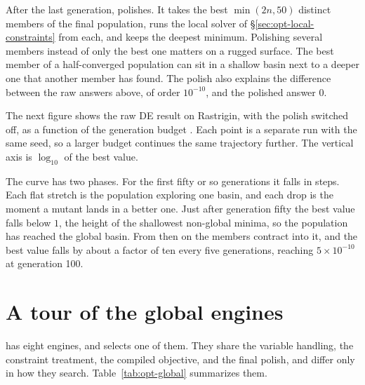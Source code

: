 After the last generation,  polishes. It takes the best
\(\min(2n, 50)\) distinct members of the final population, runs the local
solver of \S\ref{sec:opt-local-constraints} from each, and keeps the deepest
minimum. Polishing several members instead of only the best one matters on a
rugged surface. The best member of a half-converged population can sit in a
shallow basin next to a deeper one that another member has found. The polish
also explains the difference between the raw answers above, of order
\(10^{-10}\), and the polished answer \(0\).

The next figure shows the raw DE result on Rastrigin, with the polish switched
off, as a function of the generation budget . Each point is a
separate run with the same seed, so a larger budget continues the same
trajectory further. The vertical axis is \(\log_{10}\) of the best value.


The curve has two phases. For the first fifty or so generations it falls in
steps. Each flat stretch is the population exploring one basin, and each drop
is the moment a mutant lands in a better one. Just after generation fifty the
best value falls below \(1\), the height of the shallowest non-global minima,
so the population has reached the global basin. From then on the members
contract into it, and the best value falls by about a factor of ten every five
generations, reaching \(5\times10^{-10}\) at generation 100.


\section{A tour of the global engines}
\label{sec:opt-engines}

 has eight engines, and  selects one of them. They share the variable handling, the
constraint treatment, the compiled objective, and the final polish, and differ
only in how they search. Table~\ref{tab:opt-global} summarizes them.

